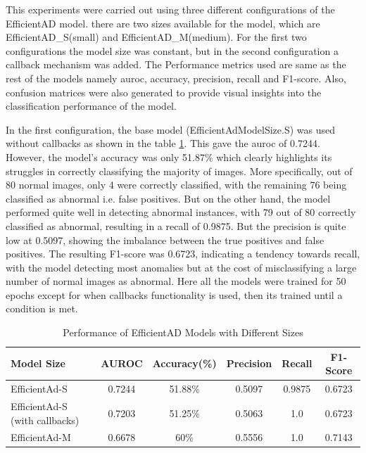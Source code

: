 This experiments were carried out using three different configurations of the EfficientAD model. there are two sizes available for the model, which are EfficientAD\_S(small) and EfficientAD\_M(medium). For the first two configurations the model size was constant, but in the second configuration a callback mechanism was added. The Performance metrics used are same as the rest of the models namely \gls{auroc}, accuracy, precision, recall and F1-score. Also, confusion matrices were also generated to provide visual insights into the classification performance of the model.

In the first configuration, the base model (EfficientAdModelSize.S) was used without callbacks as shown in the table \ref{tab:efficientad results}. This gave the \gls{auroc} of 0.7244. However, the model's accuracy was only 51.87\% which clearly highlights its struggles in correctly classifying the majority of images. More specifically, out of 80 normal images, only 4 were correctly classified, with the remaining 76 being classified as abnormal i.e. false positives. But on the other hand, the model performed quite well in detecting abnormal instances, with 79 out of 80 correctly classified as abnormal, resulting in a recall of 0.9875. But the precision is quite low at 0.5097, showing the imbalance between the true positives and false positives. The resulting F1-score was 0.6723, indicating a tendency towards recall, with the model detecting most anomalies but at the cost of misclassifying a large number of normal images as abnormal. Here all the models were trained for 50 epochs except for when callbacks functionality is used, then its trained until a condition is met.

\begin{table}[ht!]
    \centering
    \begin{tabular}{|l|c|c|c|c|c|}
        \hline
        \textbf{Model Size} & \textbf{AUROC} & \textbf{Accuracy(\%)} & \textbf{Precision} & \textbf{Recall} & \textbf{F1-Score} \\ \hline
        EfficientAd-S & 0.7244 & 51.88\% & 0.5097 & 0.9875 & 0.6723 \\ \hline
        EfficientAd-S (with callbacks) & 0.7203 & 51.25\% & 0.5063 & 1.0 & 0.6723 \\ \hline
        EfficientAd-M & 0.6678 & 60\% & 0.5556 & 1.0 & 0.7143 \\ \hline
    \end{tabular}
    \caption{Performance of EfficientAD Models with Different Sizes}
    \label{tab:efficientad results}
\end{table}

